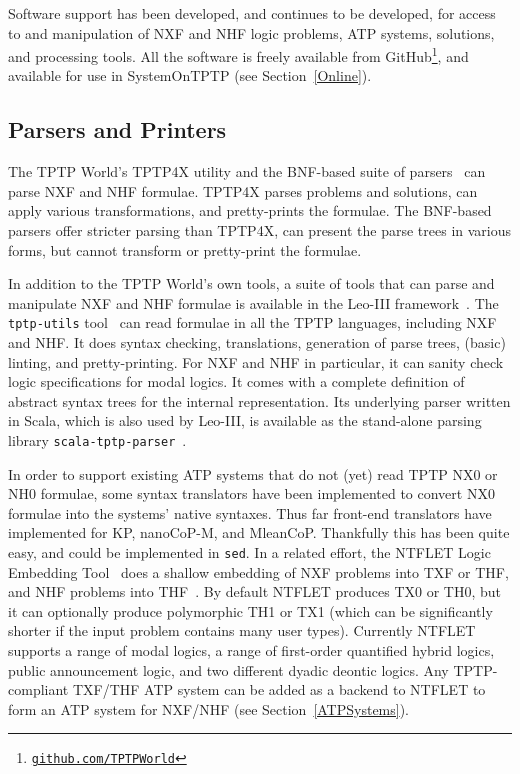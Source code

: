 \documentclass{ceurart}
\begin{document}
Software support has been developed, and continues to be developed, for access to and 
manipulation of NXF and NHF logic problems, ATP systems, solutions, and processing tools.
All the software is freely available from GitHub\footnote{%
\href{https://github.com/TPTPWorld}{\tt github.com/TPTPWorld}}, and available for use in 
SystemOnTPTP (see Section~\ref{Online}).

\subsection{Parsers and Printers}
\label{Parsers}

The TPTP World's TPTP4X utility and the BNF-based suite of parsers~\cite{VS06} can parse
NXF and NHF formulae.
TPTP4X parses problems and solutions, can apply various transformations, and pretty-prints the 
formulae.
The BNF-based parsers offer stricter parsing than TPTP4X, can present the parse trees in
various forms, but cannot transform or pretty-print the formulae.

In addition to the TPTP World's own tools, a suite of tools that can parse and manipulate 
NXF and NHF formulae is available in the Leo-III framework~\cite{SB21}.
The {\tt tptp-utils} tool~\cite{Ste22-TU} can read formulae in all the TPTP languages, including 
NXF and NHF.
It does syntax checking, translations, generation of parse trees, (basic) linting, and
pretty-printing.
For NXF and NHF in particular, it can sanity check logic specifications for modal logics.
It comes with a complete definition of abstract syntax trees for the internal representation.
Its underlying parser written in Scala, which is also used by Leo-III, is available as the 
stand-alone parsing library {\tt scala-tptp-parser}~\cite{Ste21}.

In order to support existing ATP systems that do not (yet) read TPTP NX0 or NH0 formulae,
some syntax translators have been implemented to convert NX0 formulae into the systems'
native syntaxes.
Thus far front-end translators have implemented for K\raisebox{-3pt}{S}P, nanoCoP-M, and MleanCoP.
Thankfully this has been quite easy, and could be implemented in {\tt sed}.
In a related effort, the NTFLET Logic Embedding Tool~\cite{Ste22} does a shallow embedding of 
NXF problems into TXF or THF, and NHF problems into THF~\cite{BP13,BR13,GSB17,GS18}.
By default NTFLET produces TX0 or TH0, but it can optionally produce polymorphic TH1 or TX1
(which can be significantly shorter if the input problem contains many user types).
Currently NTFLET supports a range of modal logics, a range of first-order quantified hybrid 
logics, public announcement logic, and two different dyadic deontic logics.
Any TPTP-compliant TXF/THF ATP system can be added as a backend to NTFLET to form an 
ATP system for NXF/NHF (see Section~\ref{ATPSystems}).
\end{document}
